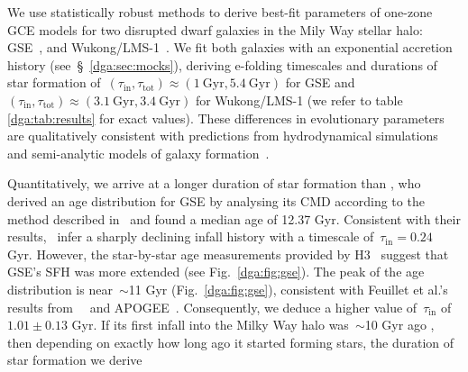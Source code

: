 We use statistically robust methods to derive best-fit parameters of
one-zone GCE models for two disrupted dwarf galaxies in the Mily Way stellar
halo: GSE~\citep{Belokurov2018, Helmi2018}, and Wukong/LMS-1~\citep{Naidu2020,
Naidu2022, Yuan2020}.
We fit both galaxies with an exponential accretion history
(see~\S~\ref{dga:sec:mocks}), deriving e-folding timescales and durations of star
formation of~$(\tau_\text{in}, \tau_\text{tot}) \approx (1~\text{Gyr},
5.4~\text{Gyr})$ for GSE and~$(\tau_\text{in}, \tau_\text{tot}) \approx
(3.1~\text{Gyr}, 3.4~\text{Gyr})$ for Wukong/LMS-1 (we refer to table
\ref{dga:tab:results} for exact values).
These differences in evolutionary parameters are qualitatively consistent with
predictions from hydrodynamical simulations~\citep[e.g.,][]{GarrisonKimmel2019}
and semi-analytic models of galaxy formation~\citep[e.g.,][]{Baugh2006,
Somerville2015a, Behroozi2019}.
\par
Quantitatively, we arrive at a longer duration of star formation than
\citet{Gallart2019}, who derived an age distribution for GSE by analysing its
CMD according to the method described in~\citet{Dolphin2002} and found a
median age of 12.37 Gyr.
Consistent with their results,~\citet{Vincenzo2019b} infer a sharply declining
infall history with a timescale of~$\tau_\text{in} = 0.24$ Gyr.
However, the star-by-star age measurements provided by H3~\citep{Conroy2019}
suggest that GSE's SFH was more extended (see Fig.~\ref{dga:fig:gse}).
The peak of the age distribution is near~$\sim$11 Gyr (Fig.~\ref{dga:fig:gse}),
consistent with Feuillet et al.'s~\citeyearpar{Feuillet2021} results
from~\gaia~\citep{GaiaCollaboration2016} and APOGEE~\citep{Majewski2017}.
Consequently, we deduce a higher value of~$\tau_\text{in}$ of~$1.01 \pm 0.13$
Gyr.
If its first infall into the Milky Way halo was~$\sim$10 Gyr ago
\citep[e.g.,][]{Helmi2018, Bonaca2020}, then depending on exactly how long ago
it started forming stars, the duration of star formation we derive
